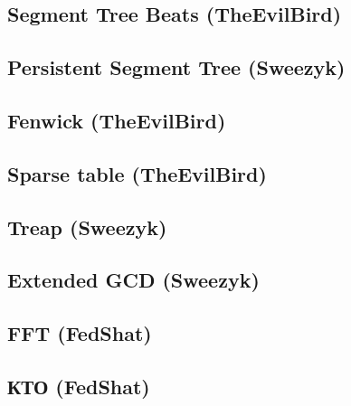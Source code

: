 \documentclass[a4paper]{article}
\begin{document}
\begin{multicols*}{2}
        \subsection{Segment Tree Beats (TheEvilBird)}
            
        
        \subsection{Persistent Segment Tree (Sweezyk)}
            
            
        \subsection{Fenwick (TheEvilBird)}
            
        
        \subsection{Sparse table (TheEvilBird)}
            
        
        \subsection{Treap (Sweezyk)}
            
        
        \subsection{Extended GCD (Sweezyk)}
            
        
        \subsection{FFT (FedShat)}
            
        
        \subsection{КТО (FedShat)}
            
        

\end{multicols*}
\end{document}
